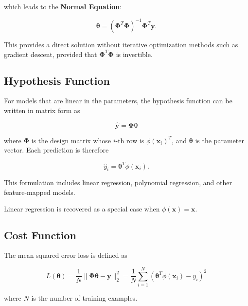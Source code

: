 \documentclass{article}
\begin{document}
which leads to the \textbf{Normal Equation}:

\[
\boldsymbol{\theta}
= (\boldsymbol{\Phi}^T \boldsymbol{\Phi})^{-1} \boldsymbol{\Phi}^T \mathbf{y}.
\]

This provides a direct solution without iterative optimization methods such as gradient descent, provided that $\boldsymbol{\Phi}^T \boldsymbol{\Phi}$ is invertible.

\subsection*{Hypothesis Function}

For models that are linear in the parameters, the hypothesis function can be written in matrix form as

\[
\hat{\mathbf{y}} = \boldsymbol{\Phi}\boldsymbol{\theta}
\]

where $\boldsymbol{\Phi}$ is the design matrix whose $i$-th row is $\phi(\mathbf{x}_i)^T$, and $\boldsymbol{\theta}$ is the parameter vector. Each prediction is therefore

\[
\hat{y}_i = \boldsymbol{\theta}^T \phi(\mathbf{x}_i).
\]

This formulation includes linear regression, polynomial regression, and other feature-mapped models.

Linear regression is recovered as a special case when $\phi(\mathbf{x}) = \mathbf{x}$.

\subsection*{Cost Function}

The mean squared error loss is defined as

\[
L(\boldsymbol{\theta}) 
= \frac{1}{N} \|\boldsymbol{\Phi}\boldsymbol{\theta} - \mathbf{y}\|_2^2
= \frac{1}{N} \sum_{i=1}^{N} (\boldsymbol{\theta}^T \phi(\mathbf{x}_i) - y_i)^2
\]

where $N$ is the number of training examples.



\end{document}
